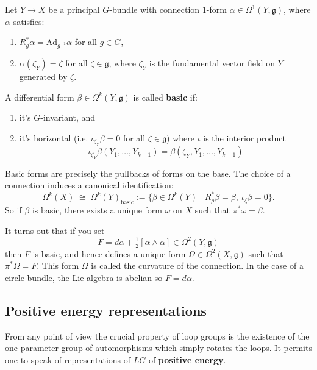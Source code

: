 \documentclass[12pt]{article}
\begin{document}
\begin{remark}
    Let $Y\to X$ be a principal $G$-bundle with connection $1$-form $\alpha\in \Omega^1(Y,\mathfrak{g})$, where $\alpha$ satisfies:
    \begin{enumerate}
        \item $R_g^*\alpha = \mathrm{Ad}_{g^{-1}}\alpha$ for all $g\in G$,
        \item $\alpha(\zeta_Y) = \zeta$ for all $\zeta\in \mathfrak{g}$, where $\zeta_Y$ is the fundamental vector field on $Y$ generated by $\zeta$.
    \end{enumerate}

    A differential form $\beta \in \Omega^k(Y,\mathfrak{g})$ is called \textbf{basic} if:
    \begin{enumerate}
        \item it's $G$-invariant, and
        \item it's horizontal (i.e. $\iota_{\zeta_Y}\beta = 0$ for all $\zeta\in \mathfrak{g}$) where $\iota$ is the interior product 
        \[ \iota_{\zeta_Y}\beta(Y_1,\dots,Y_{k-1}) = \beta(\zeta_Y,Y_1,\dots,Y_{k-1})
        \]
    \end{enumerate}
    Basic forms are precisely the pullbacks of forms on the base. The choice of a connection induces a canonical identification:
    \[
        \Omega^k(X) \;\cong\; \Omega^k(Y)_{\mathrm{basic}}
        := \{ \beta \in \Omega^k(Y) \mid R_\rho^*\beta = \beta,\ \iota_\zeta \beta = 0 \}.
    \]
    So if $\beta$ is basic, there exists a unique form $\omega$ on $X$ such that $\pi^*\omega = \beta$.

    It turns out that if you set \[F = d\alpha + \tfrac{1}{2}[\alpha \wedge \alpha] \in \Omega^2(Y,\mathfrak{g})\] then $F$ is basic, and hence defines a unique form $\Omega \in \Omega^2(X,\mathfrak{g})$ such that $\pi^*\Omega = F$. This form $\Omega$ is called the curvature of the connection. In the case of a circle bundle, the Lie algebra is abelian so $F = d\alpha$.
\end{remark} 

    \subsection{Positive energy representations}
    From any point of view the crucial property of loop groups is the existence of the one-parameter group of automorphisms which simply rotates the loops. It permits one to speak of representations of \(LG\) of \textbf{positive energy}. 
    
\end{document}
